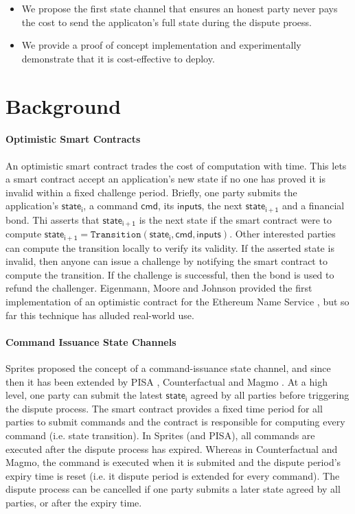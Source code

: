 \documentclass{llncs}
\newcommand{\cmd}{\mathsf{cmd}}
\newcommand{\inputs}{\mathsf{inputs}}
\newcommand{\stateinfoi}{\mathsf{state}_{\mathsf{i}}}
\newcommand{\stateinfoplus}{\mathsf{state}_{\mathsf{i+1}}}
\begin{document}
\begin{itemize}
	\item We propose the first state channel that ensures an honest party never pays the cost to send the applicaton's full state during the dispute proess.  
	\item We provide a proof of concept implementation and experimentally demonstrate that it is cost-effective to deploy. 
\end{itemize}

\section{Background} 



\paragraph{Optimistic Smart Contracts } 


An optimistic smart contract trades the cost of computation with time.
This lets a smart contract accept an application's new state if no one has proved it is invalid within a fixed challenge period. 
Briefly, one party submits the application's $\stateinfoi$, a command $\cmd$, its $\inputs$, the next $\stateinfoplus$ and a financial bond. 
Thi asserts that $\stateinfoplus$ is the next state if the smart contract were to compute  $\stateinfoplus = \texttt{Transition}(\stateinfoi, \cmd, \inputs)$. 
Other interested parties can compute the transition locally to verify its validity.
If the asserted state is invalid, then anyone can issue a challenge by notifying the smart contract to compute the transition.
If the challenge is successful, then the bond is used to refund the challenger. 
Eigenmann, Moore and Johnson provided the first implementation of an optimistic contract for the Ethereum Name Service
\cite{optimisticcontracts}, but so far this technique has alluded real-world use. 

\paragraph{Command Issuance State Channels}
Sprites proposed the concept of a command-issuance state channel, and since then it has been extended by PISA \cite{mccorry2018pisa}, Counterfactual \cite{coleman2018counterfactual} and Magmo \cite{magmo}. 
At a high level, one party can submit the latest $\stateinfoi$ agreed by all parties before triggering the dispute process.
The smart contract provides a fixed time period for all parties to submit commands and the contract is responsible for computing every command (i.e. state transition).
In Sprites (and PISA), all commands are executed after the dispute process has expired.
Whereas in Counterfactual and Magmo, the command is executed when it is submited and the dispute period's expiry time is reset (i.e. it dispute period is extended for every command). 
The dispute process can be cancelled if one party submits a later state agreed by all parties, or after the expiry time. 
\end{document}
